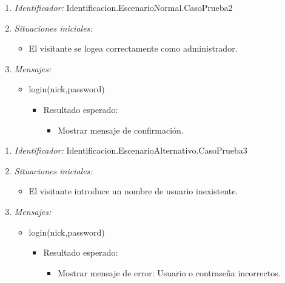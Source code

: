 \begin{enumerate}
	\item {\it Identificador:} Identificacion.EscenarioNormal.CasoPrueba2
	\item {\it Situaciones iniciales:}
    		\begin{itemize}
    			\item El visitante se logea correctamente como administrador.
		\end{itemize}
	\item {\it Mensajes:}
		\begin{itemize}
			\item login(nick,password)
				 \begin{itemize}
					 	\item Resultado esperado:
					 \begin{itemize}
					 	 \item Mostrar mensaje de confirmación.
					 \end{itemize}
				 \end{itemize}
		\end{itemize}
\end{enumerate}


\begin{enumerate}
	\item {\it Identificador:} Identificacion.EscenarioAlternativo.CasoPrueba3
	\item {\it Situaciones iniciales:}
    		\begin{itemize}
    			\item El visitante introduce un nombre de usuario inexistente.
		\end{itemize}
	\item {\it Mensajes:}
		\begin{itemize}
			\item login(nick,password)
				 \begin{itemize}
					 	\item Resultado esperado:
					 \begin{itemize}
					 	 \item Mostrar mensaje de error: Usuario o contraseña incorrectos.
					 \end{itemize}
				 \end{itemize}
		\end{itemize}
\end{enumerate}


